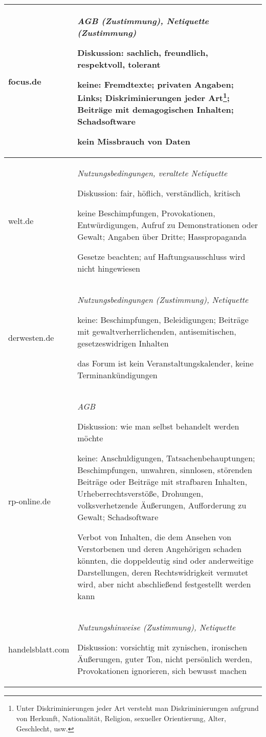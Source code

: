 \begin{landscape}
\begin{longtable}{lp{170mm}}
focus.de & \emph{AGB (Zustimmung), Netiquette (Zustimmung)}
	
	Diskussion: sachlich, freundlich, respektvoll, tolerant
	
	keine: Fremdtexte; privaten Angaben; Links; Diskriminierungen jeder Art\footnote{Unter Diskriminierungen jeder Art versteht man Diskriminierungen  
	aufgrund von Herkunft, Nationalität, Religion, sexueller Orientierung, Alter,
	Geschlecht, usw.}; Beiträge mit  demagogischen Inhalten; Schadsoftware
	
	kein Missbrauch von Daten
	\tabularnewline\midrule

welt.de & \emph{Nutzungsbedingungen, veraltete Netiquette}

	Diskussion: fair, höflich, verständlich, kritisch
		
	keine Be\-schim\-pfung\-en, Pro\-vo\-ka\-tio\-nen, Ent\-wür\-di\-gung\-en, Auf\-ruf zu Demonstrationen oder Gewalt; Angaben über Dritte; 					Hasspropaganda 
	
	Gesetze beachten; auf Haftungsausschluss wird nicht hingewiesen\tabularnewline\midrule

derwesten.de & \emph{Nutzungsbedingungen (Zustimmung), Netiquette}

	keine: Beschimpfungen, Beleidigungen; Beiträge mit gewaltverherrlichenden, antisemitischen, gesetzeswidrigen Inhalten

	das Forum ist kein Ver\-an\-stal\-tungs\-ka\-len\-der, keine Ter\-min\-an\-kün\-di\-gun\-gen
	\tabularnewline\midrule


rp-online.de & \emph{AGB}

	Diskussion: wie man selbst behandelt werden möchte
	
	keine: Anschuldigungen, Tatsachenbehauptungen; Beschimpfungen, unwahren, sinnlosen, störenden Beiträge oder Beiträge mit strafbaren Inhalten, Urheberrechtsverstöße, Drohungen, volksverhetzende Äußerungen, Aufforderung zu Gewalt; Schadsoftware
	
	Verbot von Inhalten, die dem Ansehen von Verstorbenen und deren Angehörigen schaden könnten, die doppeldeutig
	sind oder anderweitige Darstellungen, deren Rechtswidrigkeit vermutet
	wird, aber nicht abschließend festgestellt werden kann
	\tabularnewline\midrule

handelsblatt.com & \emph{Nutzungshinweise (Zustimmung), Netiquette}

	Diskussion: vorsichtig mit zynischen, ironischen Äußerungen, guter Ton, nicht
	persönlich werden, Provokationen ignorieren, sich bewusst machen
	 

\end{longtable}
\end{landscape}
